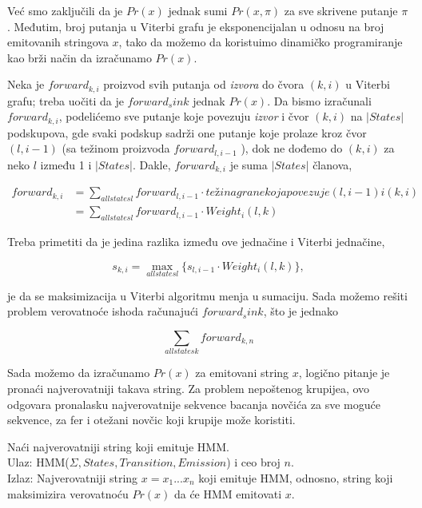 Već smo zaključili da je $ Pr(x) $ jednak sumi $ Pr(x, \pi) $ za sve skrivene putanje $ \pi $. Međutim, broj putanja u Viterbi grafu je eksponencijalan u odnosu na broj emitovanih stringova $ x $, tako da možemo da koristuimo dinamičko programiranje kao brži način da izračunamo $ Pr(x) $.

Neka je $ forward_{k, i} $ proizvod svih putanja od \textit{izvora} do čvora $ (k, i) $ u Viterbi grafu; treba uočiti da je $ forward_sink $ jednak $ Pr(x) $. Da bismo izračunali $ forward_{k, i} $, podelićemo sve putanje koje povezuju \textit{izvor} i čvor $ (k, i) $ na $ |States| $ podskupova, gde svaki podskup sadrži one putanje koje prolaze kroz čvor $ (l, i-1) $ (sa težinom proizvoda  $ forward_{l, i-1} $ ), dok ne dođemo do $ (k, i) $ za neko $ l $ između 1 i $ |States| $. Dakle, $ forward_{k, i} $ je suma $ |States| $ članova, 


\begin{equation}
\begin{aligned}
    forward_{k, i} &= {\displaystyle \sum_{all states l} forward_{l, i-1} \cdot težina grane koja povezuje (l, i-1) i (k, i)} \\
    &= {\displaystyle \sum_{all states l} forward_{l, i-1} \cdot Weight_i(l, k)}
\end{aligned}
\end{equation}


Treba primetiti da je jedina razlika između ove jednačine i Viterbi jednačine,

\begin{equation}
    s_{k, i} =  {\displaystyle \max_{all states l} \{s_{l, i-1} \cdot Weight_i(l, k)\}}, 
\end{equation}

je da se maksimizacija u Viterbi algoritmu menja u sumaciju. Sada možemo rešiti problem verovatnoće ishoda računajući $ forward_sink $, što je jednako

\begin{equation}
    {\displaystyle \sum_{all states k} forward_{k, n}}
\end{equation}

Sada možemo da izračunamo $ Pr(x) $ za emitovani string $ x $, logično pitanje je pronaći najverovatniji takava string. Za problem nepoštenog krupijea, ovo odgovara pronalasku najverovatnije sekvence bacanja novčića za sve moguće sekvence, za fer i otežani novčic koji krupije može koristiti.

\begin{problem}
    Naći najverovatniji string koji emituje HMM. \\
    Ulaz: HMM($ \Sigma, States, Transition, Emission $) i ceo broj $ n $.\\
    Izlaz: Najverovatniji string $ x = x_1...x_n $ koji emituje HMM, odnosno, string koji maksimizira verovatnoću $ Pr(x) $ da će HMM emitovati $ x $.
    
\end{problem}


